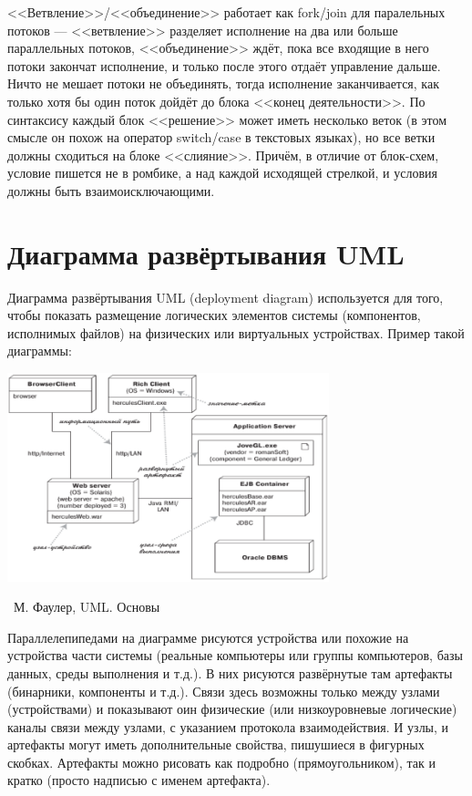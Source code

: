 \documentclass[a5paper]{article}
\newcommand{\attribution}[1] {
	\vspace{-5mm}\begin{flushright}\begin{scriptsize}%
	{\textcopyright\, #1}\end{scriptsize}\end{flushright}
}
\begin{document}
<<Ветвление>>/<<объединение>> работает как fork/join для паралельных потоков --- <<ветвление>> разделяет исполнение на два или больше параллельных потоков, <<объединение>> ждёт, пока все входящие в него потоки закончат исполнение, и только после этого отдаёт управление дальше. Ничто не мешает потоки не объединять, тогда исполнение заканчивается, как только хотя бы один поток дойдёт до блока <<конец деятельности>>. По синтаксису каждый блок <<решение>> может иметь несколько веток (в этом смысле он похож на оператор switch/case в текстовых языках), но все ветки должны сходиться на блоке <<слияние>>. Причём, в отличие от блок-схем, условие пишется не в ромбике, а над каждой исходящей стрелкой, и условия должны быть взаимоисключающими.

\section{Диаграмма развёртывания UML}

Диаграмма развёртывания UML (deployment diagram) используется для того, чтобы показать размещение логических элементов системы (компонентов, исполнимых файлов) на физических или виртуальных устройствах. Пример такой диаграммы:

\begin{center}
	\includegraphics[width=0.7\textwidth]{deploymentDiagram.png}
	\attribution{М. Фаулер, UML. Основы}
\end{center}

Параллелепипедами на диаграмме рисуются устройства или похожие на устройства части системы (реальные компьютеры или группы компьютеров, базы данных, среды выполнения и т.д.). В них рисуются развёрнутые там артефакты (бинарники, компоненты и т.д.). Связи здесь возможны только между узлами (устройствами) и показывают оин физические (или низкоуровневые логические) каналы связи между узлами, с указанием протокола взаимодействия. И узлы, и артефакты могут иметь дополнительные свойства, пишушиеся в фигурных скобках. Артефакты можно рисовать как подробно (прямоугольником), так и кратко (просто надписью с именем артефакта).
\end{document}
